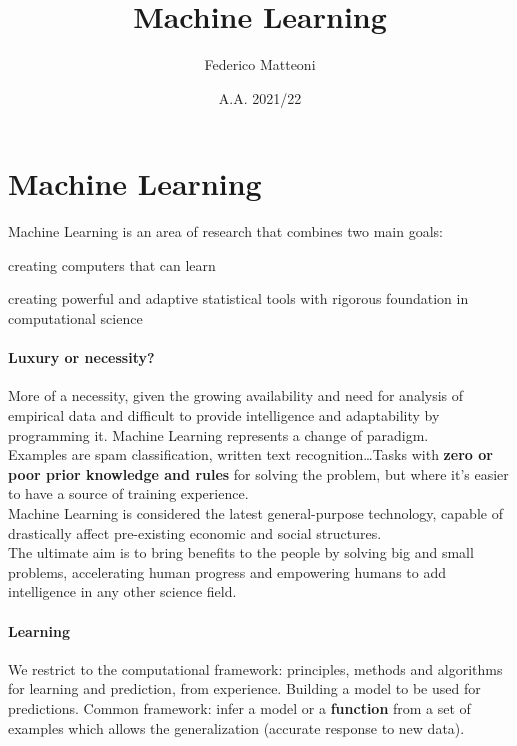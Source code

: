 \documentclass[10pt]{report}
\begin{document}
\title{Machine Learning}
\author{Federico Matteoni}
\date{A.A. 2021/22}
\renewcommand*\contentsname{Index}

\maketitle
\tableofcontents
\pagebreak
\section{Machine Learning}
Machine Learning is an area of research that combines two main goals:
\begin{list}{}{}
	\item creating computers that can learn
	\item creating powerful and adaptive statistical tools with rigorous foundation in computational science
\end{list}
\paragraph{Luxury or necessity?} More of a necessity, given the growing availability and need for analysis of empirical data and difficult to provide intelligence and adaptability by programming it. Machine Learning represents a change of paradigm.\\
Examples are spam classification, written text recognition\ldots Tasks with \textbf{zero or poor prior knowledge and rules} for solving the problem, but where it's easier to have a source of training experience.\\
Machine Learning is considered the latest general-purpose technology, capable of drastically affect pre-existing economic and social structures.\\
The ultimate aim is to bring benefits to the people by solving big and small problems, accelerating human progress and empowering humans to add intelligence in any other science field.
\paragraph{Learning} We restrict to the computational framework: principles, methods and algorithms for learning and prediction, from experience. Building a model to be used for predictions. Common framework: infer a model or a \textbf{function} from a set of examples which allows the generalization (accurate response to new data).
\end{document}
